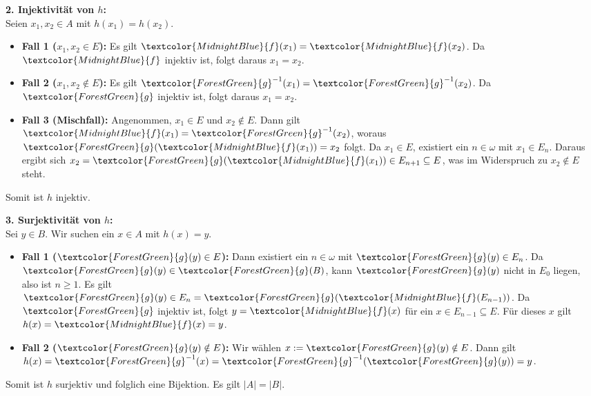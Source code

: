 \begin{math-stroke}
\begin{short-proof}
\textbf{2. Injektivität von $h$:} \\
Seien $x_1, x_2 \in A$ mit $h(x_1) = h(x_2)$.
\begin{itemize}
    \item \textbf{Fall 1 ($x_1, x_2 \in E$):} Es gilt $\textcolor{MidnightBlue}{f}(x_1) = \textcolor{MidnightBlue}{f}(x_2)$. Da $\textcolor{MidnightBlue}{f}$ injektiv ist, folgt daraus $x_1 = x_2$.
    \item \textbf{Fall 2 ($x_1, x_2 \notin E$):} Es gilt $\textcolor{ForestGreen}{g}^{-1}(x_1) = \textcolor{ForestGreen}{g}^{-1}(x_2)$. Da $\textcolor{ForestGreen}{g}$ injektiv ist, folgt daraus $x_1 = x_2$.
    \item \textbf{Fall 3 (Mischfall):} Angenommen, $x_1 \in E$ und $x_2 \notin E$. Dann gilt $\textcolor{MidnightBlue}{f}(x_1) = \textcolor{ForestGreen}{g}^{-1}(x_2)$, woraus $\textcolor{ForestGreen}{g}(\textcolor{MidnightBlue}{f}(x_1)) = x_2$ folgt. Da $x_1 \in E$, existiert ein $n \in \omega$ mit $x_1 \in E_n$. Daraus ergibt sich $x_2 = \textcolor{ForestGreen}{g}(\textcolor{MidnightBlue}{f}(x_1)) \in E_{n+1} \subseteq E$, was im Widerspruch zu $x_2 \notin E$ steht.
\end{itemize}
Somit ist $h$ injektiv.

\textbf{3. Surjektivität von $h$:} \\
Sei $y \in B$. Wir suchen ein $x \in A$ mit $h(x) = y$.
\begin{itemize}
    \item \textbf{Fall 1 ($\textcolor{ForestGreen}{g}(y) \in E$):} Dann existiert ein $n \in \omega$ mit $\textcolor{ForestGreen}{g}(y) \in E_n$. Da $\textcolor{ForestGreen}{g}(y) \in \textcolor{ForestGreen}{g}(B)$, kann $\textcolor{ForestGreen}{g}(y)$ nicht in $E_0$ liegen, also ist $n \ge 1$. Es gilt $\textcolor{ForestGreen}{g}(y) \in E_n = \textcolor{ForestGreen}{g}(\textcolor{MidnightBlue}{f}(E_{n-1}))$. Da $\textcolor{ForestGreen}{g}$ injektiv ist, folgt $y = \textcolor{MidnightBlue}{f}(x)$ für ein $x \in E_{n-1} \subseteq E$. Für dieses $x$ gilt $h(x) = \textcolor{MidnightBlue}{f}(x) = y$.
    \item \textbf{Fall 2 ($\textcolor{ForestGreen}{g}(y) \notin E$):} Wir wählen $x := \textcolor{ForestGreen}{g}(y) \notin E$. Dann gilt $h(x) = \textcolor{ForestGreen}{g}^{-1}(x) = \textcolor{ForestGreen}{g}^{-1}(\textcolor{ForestGreen}{g}(y)) = y$.
\end{itemize}
Somit ist $h$ surjektiv und folglich eine Bijektion. Es gilt $|A| = |B|$.
\end{short-proof}
\end{math-stroke}

